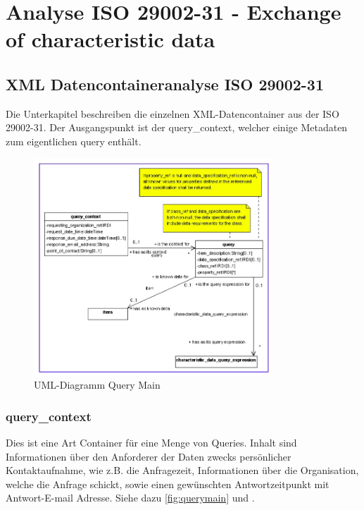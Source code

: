 \chapter{Analyse ISO 29002-31 - Exchange of characteristic data}\label{kap:analyse2900231}

\section{XML Datencontaineranalyse ISO 29002-31}
Die Unterkapitel beschreiben die einzelnen XML-Datencontainer aus der ISO 29002-31. Der Ausgangspunkt ist der query\_context, welcher einige Metadaten zum eigentlichen query enthält. 

\begin{figure}[htbp]
	\centering
		\includegraphics[width=0.80\textwidth]{images/query_main.jpg}
		\caption[UML-Diagramm Query Main]{UML-Diagramm Query Main\footnotemark}
	\label{fig:querymain}
\end{figure}

\subsection{query\_context}
Dies ist eine Art Container für eine Menge von Queries. Inhalt sind Informationen über den Anforderer der Daten zwecks persönlicher Kontaktaufnahme, wie z.B. die Anfragezeit, Informationen über die Organisation, welche die Anfrage schickt, sowie einen gewünschten Antwortzeitpunkt mit Antwort-E-mail Adresse. Siehe dazu \autoref{fig:querymain} und \citep[vgl][Kap. 5.2.2]{iso29002-31}.  

